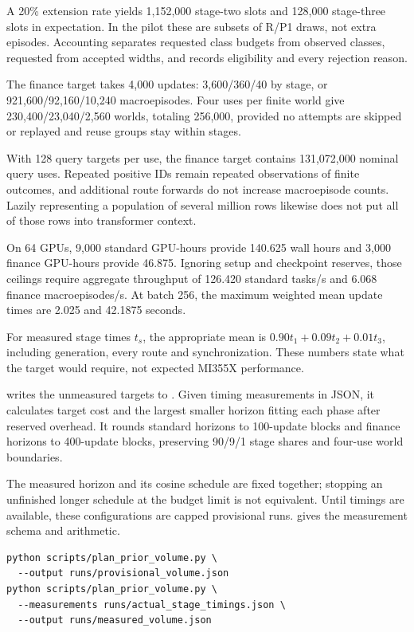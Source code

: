 \documentclass[11pt]{article}
\begin{document}
A 20\% extension rate yields 1,152,000 stage-two slots and 128,000 stage-three slots in expectation. In the pilot these are subsets of R/P1 draws, not extra episodes. Accounting separates requested class budgets from observed classes, requested from accepted widths, and records eligibility and every rejection reason.

The finance target takes 4,000 updates: 3,600/360/40 by stage, or 921,600/92,160/10,240 macroepisodes. Four uses per finite world give 230,400/23,040/2,560 worlds, totaling 256,000, provided no attempts are skipped or replayed and reuse groups stay within stages.

With 128 query targets per use, the finance target contains 131,072,000 nominal query uses. Repeated positive IDs remain repeated observations of finite outcomes, and additional route forwards do not increase macroepisode counts. Lazily representing a population of several million rows likewise does not put all of those rows into transformer context.

On 64 GPUs, 9,000 standard GPU-hours provide 140.625 wall hours and 3,000 finance GPU-hours provide 46.875. Ignoring setup and checkpoint reserves, those ceilings require aggregate throughput of 126.420 standard tasks/s and 6.068 finance macroepisodes/s. At batch 256, the maximum weighted mean update times are 2.025 and 42.1875 seconds.

For measured stage times $t_s$, the appropriate mean is $0.90t_1+0.09t_2+0.01t_3$, including generation, every route and synchronization. These numbers state what the target would require, not expected MI355X performance.

 writes the unmeasured targets to . Given timing measurements in JSON, it calculates target cost and the largest smaller horizon fitting each phase after reserved overhead. It rounds standard horizons to 100-update blocks and finance horizons to 400-update blocks, preserving 90/9/1 stage shares and four-use world boundaries.

The measured horizon and its cosine schedule are fixed together; stopping an unfinished longer schedule at the budget limit is not equivalent. Until timings are available, these configurations are capped provisional runs.  gives the measurement schema and arithmetic.

\begin{lstlisting}
python scripts/plan_prior_volume.py \
  --output runs/provisional_volume.json
python scripts/plan_prior_volume.py \
  --measurements runs/actual_stage_timings.json \
  --output runs/measured_volume.json
\end{lstlisting}
\end{document}
